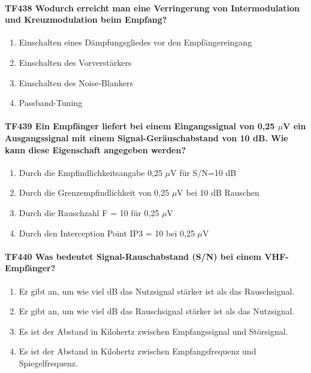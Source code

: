 \documentclass[8pt]{article}
\begin{document}
\paragraph*{TF438 Wodurch erreicht man eine Verringerung von Intermodulation und Kreuzmodulation beim Empfang?}
\begin{enumerate}[nolistsep,label=\Alph*]
\item Einschalten eines Dämpfungsgliedes vor den Empfängereingang
\item Einschalten des Vorverstärkers 
\item Einschalten des Noise-Blankers
\item Passband-Tuning
\end{enumerate}

\paragraph*{TF439 Ein Empfänger liefert bei einem Eingangssignal von 0,25 $\mu$V ein Ausgangssignal mit einem Signal-Geräuschabstand von 10 dB. Wie kann diese Eigenschaft angegeben werden?}
\begin{enumerate}[nolistsep,label=\Alph*]
\item Durch die Empfindlichkeitsangabe 0,25 $\mu$V für S/N=10 dB
\item Durch die Grenzempfindlichkeit von 0,25 $\mu$V bei 10 dB Rauschen
\item Durch die Rauschzahl F = 10 für 0,25 $\mu$V
\item Durch den Interception Point IP3 = 10 bei 0,25 $\mu$V
\end{enumerate}

\paragraph*{TF440 Was bedeutet Signal-Rauschabstand (S/N) bei einem VHF-Empfänger?}
\begin{enumerate}[nolistsep,label=\Alph*]
\item Er gibt an, um wie viel dB das Nutzsignal stärker ist als das Rauschsignal.
\item Er gibt an, um wie viel dB das Rauschsignal stärker ist als das Nutzsignal.
\item Es ist der Abstand in Kilohertz zwischen Empfangssignal und Störsignal.
\item Es ist der Abstand in Kilohertz zwischen Empfangsfrequenz und Spiegelfrequenz.
\end{enumerate}
\end{document}
